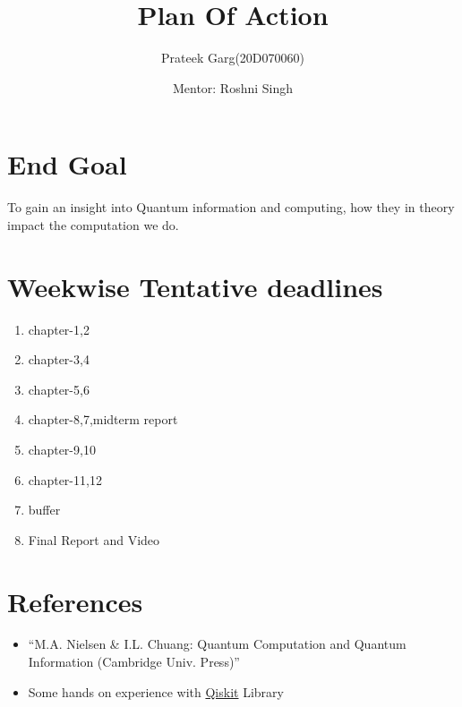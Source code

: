 \documentclass{article}
\title{Plan Of Action}
\author{Prateek Garg(20D070060)}
\date{Mentor: Roshni Singh}
\begin{document}
\maketitle

\section{End Goal}
To gain an insight into Quantum information and computing, how they in theory impact the computation we do.
\section{Weekwise Tentative deadlines}
\begin{enumerate}
    \item chapter-1,2
    \item chapter-3,4
    \item chapter-5,6
    \item chapter-8,7,midterm report
    \item chapter-9,10
    \item chapter-11,12
    \item buffer
    \item Final Report and Video
\end{enumerate}

\section{References}
\begin{itemize}
    \item “M.A. Nielsen \& I.L. Chuang: Quantum Computation and Quantum Information (Cambridge Univ. Press)”
    \item Some hands on experience with \href{https://qiskit.org/textbook/ch-states/introduction.html}{Qiskit} Library
\end{itemize}
\end{document}
